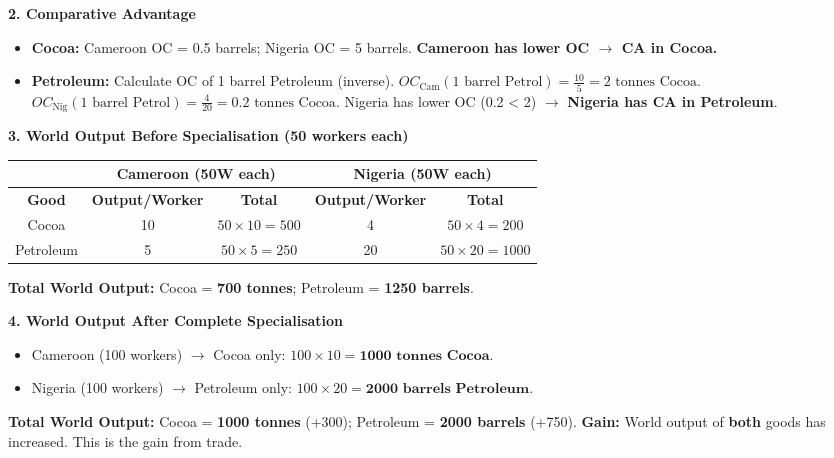 \documentclass[11pt]{article}
\begin{document}
\begin{exoresolu}
\textbf{2. Comparative Advantage}
\begin{itemize}
    \item \textbf{Cocoa:} Cameroon OC = 0.5 barrels; Nigeria OC = 5 barrels. \textbf{Cameroon has lower OC $\rightarrow$ CA in Cocoa.}
    \item \textbf{Petroleum:} Calculate OC of 1 barrel Petroleum (inverse).
    $OC_{\text{Cam}}(\text{1 barrel Petrol}) = \frac{10}{5} = 2 \text{ tonnes Cocoa}$.
    $OC_{\text{Nig}}(\text{1 barrel Petrol}) = \frac{4}{20} = 0.2 \text{ tonnes Cocoa}$.
    Nigeria has lower OC (0.2 < 2) $\rightarrow$ \textbf{Nigeria has CA in Petroleum}.
\end{itemize}

\textbf{3. World Output Before Specialisation (50 workers each)}
\begin{center}
\begin{tabular}{|c|c|c|c|c|}\hline
 & \multicolumn{2}{c|}{\textbf{Cameroon (50W each)}} & \multicolumn{2}{c|}{\textbf{Nigeria (50W each)}} \\ \hline
\textbf{Good} & \textbf{Output/Worker} & \textbf{Total} & \textbf{Output/Worker} & \textbf{Total} \\ \hline
Cocoa & 10 & $50 \times 10 = 500$ & 4 & $50 \times 4 = 200$ \\ \hline
Petroleum & 5 & $50 \times 5 = 250$ & 20 & $50 \times 20 = 1000$ \\ \hline
\end{tabular}
\end{center}
\textbf{Total World Output:} Cocoa = \textbf{700 tonnes}; Petroleum = \textbf{1250 barrels}.

\textbf{4. World Output After Complete Specialisation}
\begin{itemize}
    \item Cameroon (100 workers) $\rightarrow$ Cocoa only: $100 \times 10 = \mathbf{1000 \text{ tonnes Cocoa}}$.
    \item Nigeria (100 workers) $\rightarrow$ Petroleum only: $100 \times 20 = \mathbf{2000 \text{ barrels Petroleum}}$.
\end{itemize}
\textbf{Total World Output:} Cocoa = \textbf{1000 tonnes} (+300); Petroleum = \textbf{2000 barrels} (+750).
\textbf{Gain:} World output of \textbf{both} goods has increased. This is the gain from trade.


\end{exoresolu}
\end{document}
